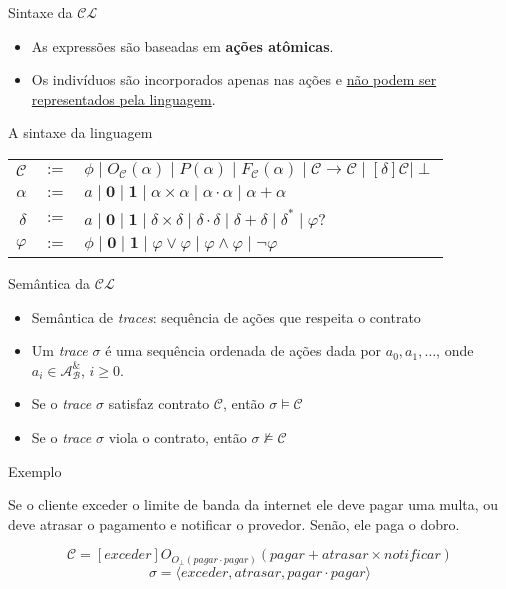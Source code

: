 \begin{frame}{Sintaxe da $\mathcal{CL}$}
    \begin{itemize}
        \item As expressões são baseadas em \textbf{ações atômicas}.
        \item Os indivíduos são incorporados apenas nas ações e \underline{não podem ser representados pela linguagem}.
    \end{itemize}
    \begin{block}{A sintaxe da linguagem}
        \centering
        \begin{tabular}{rll}
            $\mathcal{C}$ & $:=$ & $\phi \mid O_\mathcal{C}(\alpha) \mid P(\alpha) \mid F_\mathcal{C}(\alpha) \mid \mathcal{C} \to \mathcal{C} \mid [\delta]\mathcal{C} \mid \perp $\\
            $\alpha$ & $:=$ & $ a \mid \textbf{0} \mid \textbf{1} \mid \alpha \times \alpha \mid \alpha \cdot \alpha \mid \alpha + \alpha$ \\
            $\delta$ & $:=$ & $ a \mid \textbf{0} \mid \textbf{1} \mid \delta \times \delta \mid \delta \cdot \delta \mid \delta + \delta \mid \delta^* \mid \varphi?$ \\
            $\varphi$ & $:=$ & $ \phi \mid \textbf{0} \mid \textbf{1} \mid \varphi \vee \varphi \mid \varphi \wedge \varphi \mid \neg \varphi$ \\
        \end{tabular}
    \end{block}
\end{frame}

\begin{frame}{Semântica da $\mathcal{CL}$}
\begin{itemize}
\item Semântica de \textit{traces}: sequência de ações que respeita o contrato
\item Um \textit{trace} $\sigma$ é uma sequência ordenada de ações
 dada por $a_0, a_1, \dots$, onde $a_i \in \mathcal{A}^\&_\mathcal{B}$, $i\geq 0$.
\item Se o \textit{trace} $\sigma$ satisfaz contrato $\mathcal{C}$, então  $\sigma \models \mathcal{C}$
\item Se o \textit{trace} $\sigma$ viola o contrato, então $\sigma \not \models \mathcal{C}$
\end{itemize}

\begin{block}{Exemplo}
\begin{center}
{\footnotesize 
Se o cliente exceder o limite de banda da internet ele deve pagar uma multa, ou 
 deve atrasar o pagamento e notificar o provedor. Senão, ele paga o dobro.
 }
\end{center}
$$ \mathcal{C} = [exceder]O_{O_{\perp}(pagar\cdot pagar)}(pagar + atrasar \times notificar)$$ 
$$ \sigma = \langle exceder, atrasar, pagar\cdot pagar \rangle $$
\end{block}
\end{frame}

